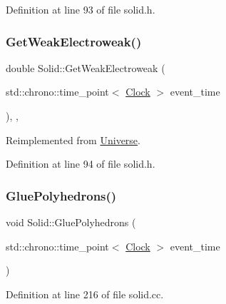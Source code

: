 Definition at line 93 of file solid.\+h.

\mbox{\label{class_solid_ac98f9c827d58a631627423e25dd611ba}} 
\subsubsection{\texorpdfstring{Get\+Weak\+Electroweak()}{GetWeakElectroweak()}}
{\footnotesize\ttfamily double Solid\+::\+Get\+Weak\+Electroweak (\begin{DoxyParamCaption}\item[{std\+::chrono\+::time\+\_\+point$<$ \hyperlink{universe_8h_a0ef8d951d1ca5ab3cfaf7ab4c7a6fd80}{Clock} $>$}]{event\+\_\+time }\end{DoxyParamCaption})\hspace{0.3cm}{\ttfamily [inline]}, {\ttfamily [final]}, {\ttfamily [virtual]}}



Reimplemented from \hyperlink{class_universe_a645299738e6b798a037f2a15a2e7cf4d}{Universe}.



Definition at line 94 of file solid.\+h.

\mbox{\label{class_solid_a94bb5df6d873c14a94355fc95557efd6}} 
\subsubsection{\texorpdfstring{Glue\+Polyhedrons()}{GluePolyhedrons()}}
{\footnotesize\ttfamily void Solid\+::\+Glue\+Polyhedrons (\begin{DoxyParamCaption}\item[{std\+::chrono\+::time\+\_\+point$<$ \hyperlink{universe_8h_a0ef8d951d1ca5ab3cfaf7ab4c7a6fd80}{Clock} $>$}]{event\+\_\+time }\end{DoxyParamCaption})}



Definition at line 216 of file solid.\+cc.

